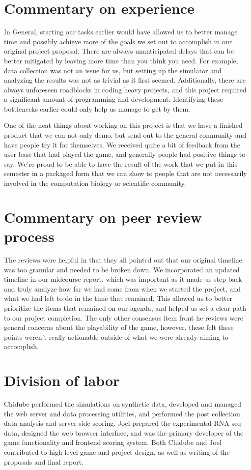 \documentclass[12pt]{article}
\begin{document}
\section*{Commentary on experience}

In General, starting our tasks earlier would have allowed us to better manage time and possibly achieve more of the goals we set out to accomplish in our original project proposal.
There are always unanticipated delays that can be better mitigated by leaving more time than you think you need. For example, data collection was not an issue for us, but
setting up the simulator and analyzing the results was not as trivial as it first seemed. Additionally, there are always unforeseen roadblocks in coding heavy projects, and this project
required a significant amount of programming and development. Identifying these bottlenecks earlier could only help us manage to get by them.

One of the neat things about working on this project is that we have a finished product that we can not only demo, but send out to the general community and have people try it for themselves.
We received quite a bit of feedback from the user base that had played the game, and generally people had positive things to say. We're proud to be able to have the result of the work
that we put in this semester in a packaged form that we can show to people that are not necessarily involved in the computation biology or scientific community.

\section*{Commentary on peer review process}

The reviews were helpful in that they all pointed out that our original timeline was too granular and needed to be broken down. We incorporated an updated timeline in our midcourse
report, which was important as it made us step back and truly analyze how far we had come from when we started the project, and what we had left to do in the time that remained. This
allowed us to better prioritize the items that remained on our agenda, and helped us set a clear path to our project completion. The only other consensus item front he reviews were general
concerns about the playability of the game, however, these felt these points weren't really actionable outside of what we were already aiming to accomplish.

\section*{Division of labor}

Chidube performed the simulations on synthetic data, developed and managed the web server and data processing utilities, and performed the post collection data analysis and server-side scoring. Joel prepared the experimental RNA-seq data, designed the web browser interface, and was the primary developer of the game functionality and frontend scoring system. Both Chidube and Joel contributed to high level game and project design, as well as writing of the proposals and final report.


\end{document}
